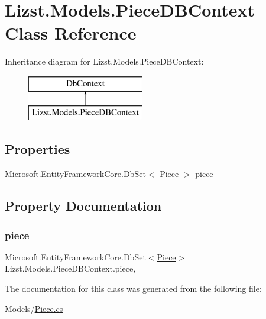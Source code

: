 \hypertarget{class_lizst_1_1_models_1_1_piece_d_b_context}{}\section{Lizst.\+Models.\+Piece\+D\+B\+Context Class Reference}
\label{class_lizst_1_1_models_1_1_piece_d_b_context}
Inheritance diagram for Lizst.\+Models.\+Piece\+D\+B\+Context\+:\begin{figure}[H]
\begin{center}
\leavevmode
\includegraphics[height=2.000000cm]{class_lizst_1_1_models_1_1_piece_d_b_context}
\end{center}
\end{figure}
\subsection*{Properties}
\begin{DoxyCompactItemize}
\item 
Microsoft.\+Entity\+Framework\+Core.\+Db\+Set$<$ \mbox{\hyperlink{class_lizst_1_1_models_1_1_piece}{Piece}} $>$ \mbox{\hyperlink{class_lizst_1_1_models_1_1_piece_d_b_context_ab3a1ad18a789a410bace717b6788ebac}{piece}}
\end{DoxyCompactItemize}


\subsection{Property Documentation}
\mbox{\label{class_lizst_1_1_models_1_1_piece_d_b_context_ab3a1ad18a789a410bace717b6788ebac}} 
\subsubsection{\texorpdfstring{piece}{piece}}
{\footnotesize\ttfamily Microsoft.\+Entity\+Framework\+Core.\+Db\+Set$<$\mbox{\hyperlink{class_lizst_1_1_models_1_1_piece}{Piece}}$>$ Lizst.\+Models.\+Piece\+D\+B\+Context.\+piece\hspace{0.3cm}{\ttfamily [get]}, {\ttfamily [set]}}



The documentation for this class was generated from the following file\+:\begin{DoxyCompactItemize}
\item 
Models/\mbox{\hyperlink{_piece_8cs}{Piece.\+cs}}\end{DoxyCompactItemize}
